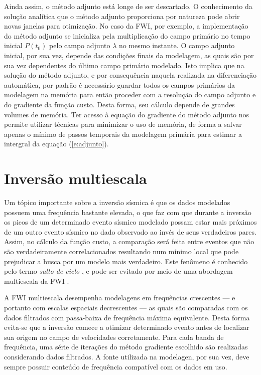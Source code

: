     Ainda assim, o método adjunto está longe de ser descartado. O conhecimento da solução analítica que o método adjunto proporciona por natureza pode abrir novas janelas para otimização. No caso da FWI, por exemplo, a implementação do método adjunto se inicializa pela multiplicação do campo primário no tempo inicial $P(t_0)$ pelo campo adjunto $\lambda$ no mesmo instante. O campo adjunto inicial, por sua vez, depende das condições finais da modelagem, as quais são por sua vez dependentes do último campo primário modelado. Isto implica que na solução do método adjunto, e por consequência naquela realizada na diferenciação automática, por padrão é necessário guardar todos os campos primários da modelagem na memória para então proceder com a resolução do campo adjunto e do gradiente da função custo. Desta forma, seu cálculo depende de grandes volumes de memória. Ter acesso à equação do gradiente do método adjunto nos permite utilizar técnicas para minimizar o uso de memória, de forma a salvar apenas o mínimo de passos temporais da modelagem primária para estimar a intergral da equação (\ref{e:adjunto}).


  \section{Inversão multiescala}

    Um tópico importante sobre a inversão sísmica é que os dados modelados possuem uma frequência bastante elevada, o que faz com que durante a inversão os picos de um determinado evento sísmico modelado possam estar mais próximos de um outro evento sísmico no dado observado ao invés de seus verdadeiros pares. Assim, no cálculo da função custo, a comparação será feita entre eventos que não são verdadeiramente correlacionados resultando num mínimo local que pode prejudicar a busca por um modelo mais verdadeiro. Este fenômeno é conhecido pelo termo \emph{salto de ciclo} \DIFdelbegin %
\DIFdelend \DIFaddbegin {}\DIFaddend , e pode ser evitado por meio de uma abordagem multiescala da FWI \DIFaddbegin {}\DIFaddend .

    A FWI multiescala desempenha modelagens em frequências crescentes --- e portanto com escalas espaciais decrescentes --- as quais são comparadas com os dados filtrados com passa-baixa de frequência máxima equivalente. Desta forma evita-se que a inversão comece a otimizar determinado evento antes de localizar sua origem no campo de velocidades corretamente. Para cada banda de frequência, uma série de iterações do método gradiente escolhido são realizadas considerando dados filtrados. A fonte utilizada na modelagen, por sua vez, deve sempre possuir conteúdo de frequência compatível com os dados em uso.

